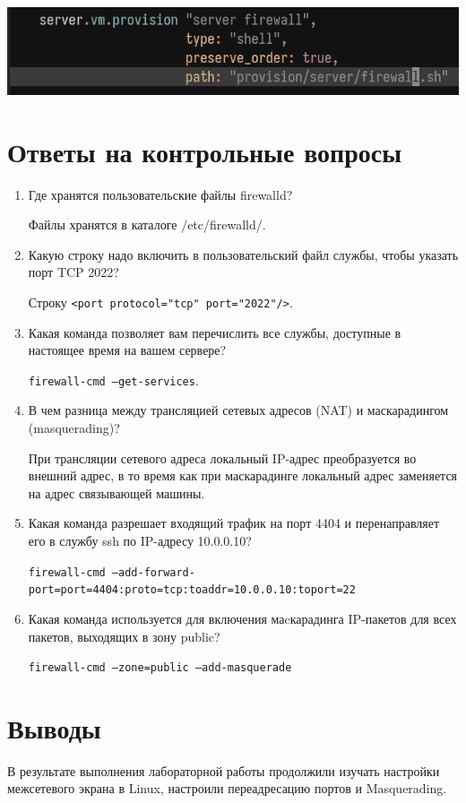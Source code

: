 \begin{enumerate}
\begin{center}
    \centering
    \includegraphics[width=\textwidth]{../images/image13.png}
    \label{img:13}
\end{center}

\end{enumerate}

\section{Ответы на контрольные вопросы}
\begin{enumerate}
\item Где хранятся пользовательские файлы firewalld?

    Файлы хранятся в каталоге /etc/firewalld/.
\item Какую строку надо включить в пользовательский файл службы, чтобы указать порт TCP 2022?

    Строку \texttt{<port protocol="tcp" port="2022"/>}.
\item Какая команда позволяет вам перечислить все службы, доступные в настоящее время на вашем сервере?

    \texttt{firewall-cmd --get-services}.
\item В чем разница между трансляцией сетевых адресов (NAT) и маскарадингом (masquerading)?

    При трансляции сетевого адреса локальный IP-адрес преобразуется во внешний адрес, в то время как при маскарадинге локальный адрес заменяется на адрес связывающей машины.
\item Какая команда разрешает входящий трафик на порт 4404 и перенаправляет его в службу ssh по IP-адресу 10.0.0.10?

    \texttt{firewall-cmd --add-forward-port=port=4404:proto=tcp:toaddr=10.0.0.10:toport=22}
\item Какая команда используется для включения маcкарадинга IP-пакетов для всех пакетов, выходящих в зону public?

    \texttt{firewall-cmd --zone=public --add-masquerade}
\end{enumerate}

\newpage
\section{Выводы}
В результате выполнения лабораторной работы продолжили изучать настройки межсетевого экрана в Linux, настроили переадресацию портов и Masquerading.


